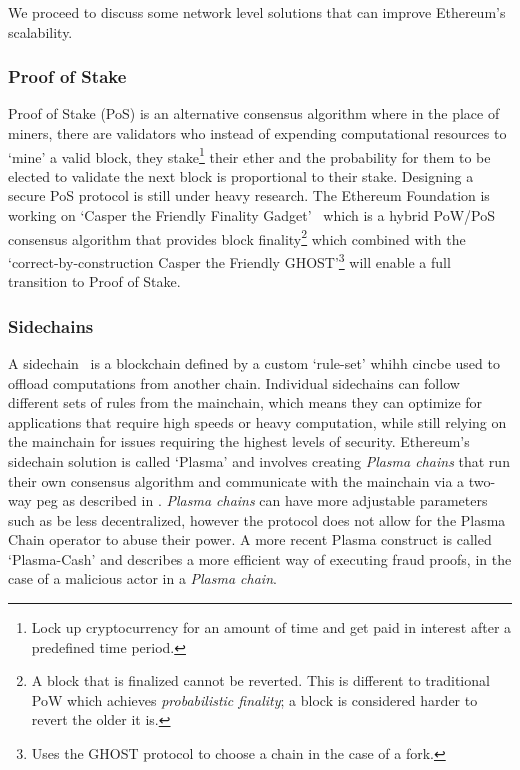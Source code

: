 

We proceed to discuss some network level solutions that can improve Ethereum's scalability.

\subsubsection*{Proof of Stake}
Proof of Stake (PoS) is an alternative consensus algorithm where in the place of miners, there are validators who instead of expending computational resources to `mine' a valid block, they stake\footnote{Lock up cryptocurrency for an amount of time and get paid in interest after a predefined time period.} their ether and the probability for them to be elected to validate the next block is proportional to their stake. Designing a secure PoS protocol is still under heavy research. The Ethereum Foundation is working on `Casper the Friendly Finality Gadget'~\cite{casperffg} which is a hybrid PoW/PoS consensus algorithm that provides block finality\footnote{A block that is finalized cannot be reverted. This is different to traditional PoW which achieves \textit{probabilistic finality}; a block is considered harder to revert the older it is.} which combined with the `correct-by-construction Casper the Friendly GHOST'\footnote{Uses the GHOST protocol to choose a chain in the case of a fork.} \cite{caspertfg} will enable a full transition to Proof of Stake. 

\subsubsection*{Sidechains}
A sidechain~\cite{sidechains} is a blockchain defined by a custom `rule-set' whihh cincbe used to offload computations from another chain. Individual sidechains can follow different sets of rules from the mainchain, which means they can optimize for applications that require high speeds or heavy computation, while still relying on the mainchain for issues requiring the highest levels of security. Ethereum's sidechain solution is called `Plasma' \cite{plasma} and involves creating \textit{Plasma chains} that run their own consensus algorithm and communicate with the mainchain via a two-way peg as described in \cite{sidechains}. \textit{Plasma chains} can have more adjustable parameters such as be less decentralized, however the protocol does not allow for the Plasma Chain operator to abuse their power. A more recent Plasma construct is called `Plasma-Cash' \cite{plasmacash} and describes a more efficient way of executing fraud proofs, in the case of a malicious actor in a \textit{Plasma chain}.

